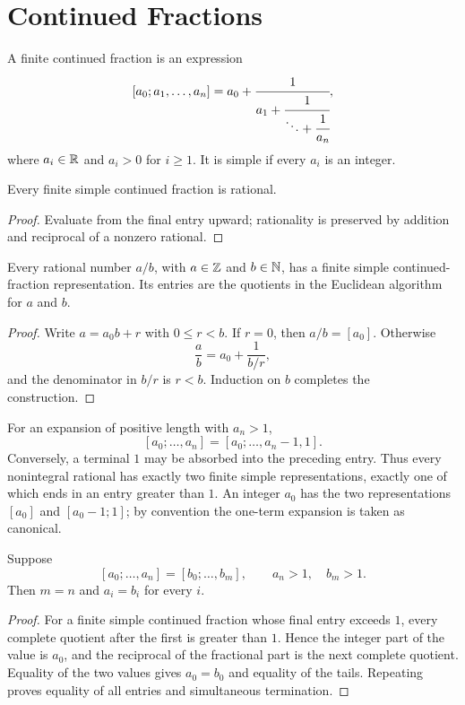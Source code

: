 \chapter{Continued Fractions}

\begin{de}
A finite continued fraction is an expression
\[
 [a_0;a_1,\ldots,a_n]
 =a_0+\cfrac1{a_1+\cfrac1{\ddots+\cfrac1{a_n}}},
\]
where $a_i\in\mathbb{R}$ and $a_i>0$ for $i\ge1$.  It is simple if every $a_i$ is an integer.
\end{de}

\begin{thm}
Every finite simple continued fraction is rational.
\end{thm}
\begin{proof}
Evaluate from the final entry upward; rationality is preserved by addition and reciprocal of a nonzero rational.
\end{proof}

\begin{thm}
Every rational number $a/b$, with $a\in\mathbb{Z}$ and $b\in\mathbb{N}$, has a finite simple continued-fraction representation.  Its entries are the quotients in the Euclidean algorithm for $a$ and $b$.
\end{thm}
\begin{proof}
Write $a=a_0b+r$ with $0\le r<b$.  If $r=0$, then $a/b=[a_0]$.  Otherwise
\[
 \frac ab=a_0+\frac1{b/r},
\]
and the denominator in $b/r$ is $r<b$.  Induction on $b$ completes the construction.
\end{proof}

\begin{remark}
For an expansion of positive length with $a_n>1$,
\[
 [a_0;\ldots,a_n]=[a_0;\ldots,a_n-1,1].
\]
Conversely, a terminal $1$ may be absorbed into the preceding entry.  Thus every nonintegral rational has exactly two finite simple representations, exactly one of which ends in an entry greater than $1$.  An integer $a_0$ has the two representations $[a_0]$ and $[a_0-1;1]$; by convention the one-term expansion is taken as canonical.
\end{remark}

\begin{thm}
Suppose
\[
 [a_0;\ldots,a_n]=[b_0;\ldots,b_m],
 \qquad a_n>1,\quad b_m>1.
\]
Then $m=n$ and $a_i=b_i$ for every $i$.
\end{thm}
\begin{proof}
For a finite simple continued fraction whose final entry exceeds $1$, every complete quotient after the first is greater than $1$.  Hence the integer part of the value is $a_0$, and the reciprocal of the fractional part is the next complete quotient.  Equality of the two values gives $a_0=b_0$ and equality of the tails.  Repeating proves equality of all entries and simultaneous termination.
\end{proof}


